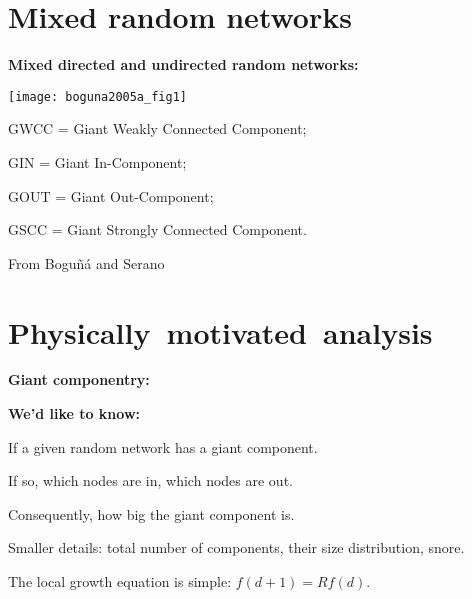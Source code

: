 \section{Mixed random networks}

  \textbf{Mixed directed and undirected random networks:}

  \texttt{[image: boguna2005a\_fig1]}

  \small

  
   
    GWCC = Giant Weakly Connected Component;
   
    GIN = Giant In-Component;
   
    GOUT = Giant Out-Component;
   
    GSCC = Giant Strongly Connected Component.
  

  \medskip

  From Bogu\~{n}\'{a} and Serano\cite{boguna2005a}


\section{Physically\ motivated\ analysis}

  \textbf{Giant componentry:}

  \textbf{We'd like to know:}
    
  
  
    If a given random network has a giant component.
  
    If so, which nodes are in, which nodes are out.
  
    Consequently, how big the giant component is.
  
    Smaller details: total number of components,
    their size distribution, snore.
  
  



  

  The local growth equation is simple: $f(d+1) = R f(d)$.


  


  


  


  


